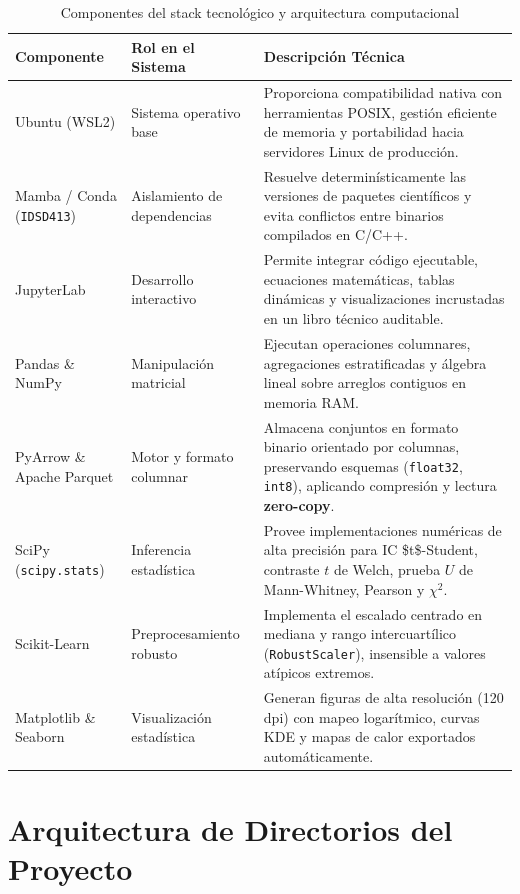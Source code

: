 \documentclass[11pt]{article}
\begin{document}
\begin{table}[H]
\caption{\label{tab:org3581e97}Componentes del stack tecnológico y arquitectura computacional}
\centering
\begin{tabular}{p{} p{} p{}}
\toprule
Componente & Rol en el Sistema & Descripción Técnica\\[0pt]
\midrule
Ubuntu (WSL2) & Sistema operativo base & Proporciona compatibilidad nativa con herramientas POSIX, gestión eficiente de memoria y portabilidad hacia servidores Linux de producción.\\[0pt]
Mamba / Conda (\texttt{IDSD413}) & Aislamiento de dependencias & Resuelve determinísticamente las versiones de paquetes científicos y evita conflictos entre binarios compilados en C/C++.\\[0pt]
JupyterLab & Desarrollo interactivo & Permite integrar código ejecutable, ecuaciones matemáticas, tablas dinámicas y visualizaciones incrustadas en un libro técnico auditable.\\[0pt]
Pandas \& NumPy & Manipulación matricial & Ejecutan operaciones columnares, agregaciones estratificadas y álgebra lineal sobre arreglos contiguos en memoria RAM.\\[0pt]
PyArrow \& Apache Parquet & Motor y formato columnar & Almacena conjuntos en formato binario orientado por columnas, preservando esquemas (\texttt{float32}, \texttt{int8}), aplicando compresión y lectura \textbf{zero-copy}.\\[0pt]
SciPy (\texttt{scipy.stats}) & Inferencia estadística & Provee implementaciones numéricas de alta precisión para IC \$t\$-Student, contraste \(t\) de Welch, prueba \(U\) de Mann-Whitney, Pearson y \(\chi^2\).\\[0pt]
Scikit-Learn & Preprocesamiento robusto & Implementa el escalado centrado en mediana y rango intercuartílico (\texttt{RobustScaler}), insensible a valores atípicos extremos.\\[0pt]
Matplotlib \& Seaborn & Visualización estadística & Generan figuras de alta resolución (120 dpi) con mapeo logarítmico, curvas KDE y mapas de calor exportados automáticamente.\\[0pt]
\bottomrule
\end{tabular}
\end{table}

\section{Arquitectura de Directorios del Proyecto}
\label{sec:orgd8bc8d5}
\end{document}
